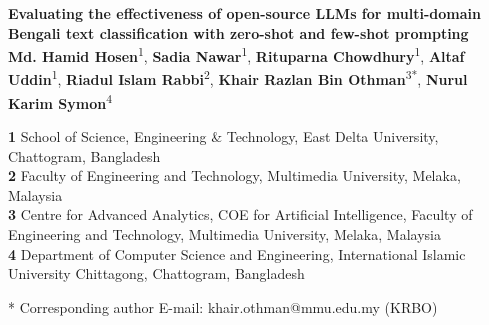 \documentclass[10pt,letterpaper]{article}
\begin{document}
\vspace*{0.2in}

\begin{flushleft}
{\Large
\textbf{Evaluating the effectiveness of open-source LLMs for multi-domain Bengali text classification with zero-shot and few-shot prompting}
}
\newline
\\
\textbf{Md. Hamid Hosen}\textsuperscript{1},
\textbf{Sadia Nawar}\textsuperscript{1},
\textbf{Rituparna Chowdhury}\textsuperscript{1},
\textbf{Altaf Uddin}\textsuperscript{1},
\textbf{Riadul Islam Rabbi}\textsuperscript{2},
\textbf{Khair Razlan Bin Othman}\textsuperscript{3*},
\textbf{Nurul Karim Symon}\textsuperscript{4}
\\
\bigskip

\textbf{1} School of Science, Engineering \& Technology, East Delta University, Chattogram, Bangladesh
\\
\textbf{2} Faculty of Engineering and Technology, Multimedia University, Melaka, Malaysia
\\
\textbf{3} Centre for Advanced Analytics, COE for Artificial Intelligence, Faculty of Engineering and Technology, Multimedia University, Melaka, Malaysia
\\
\textbf{4} Department of Computer Science and Engineering, International Islamic University Chittagong, Chattogram, Bangladesh
\\
\bigskip

* Corresponding author
E-mail: khair.othman@mmu.edu.my (KRBO)

\end{flushleft}
\end{document}
